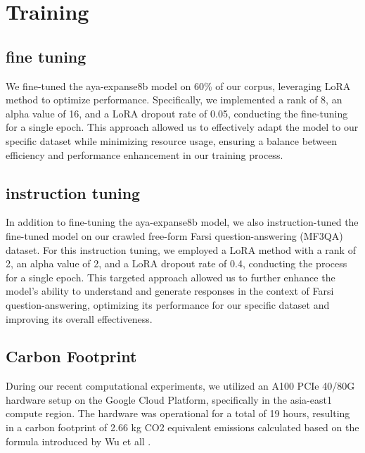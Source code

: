 \documentclass[conference]{IEEEtran}
\begin{document}
\section{Training}
\subsection{fine tuning}
We fine-tuned the aya-expanse8b model on 60\% of our corpus, leveraging LoRA
\cite{b13}
method to optimize performance. Specifically, we implemented a rank of 8, an alpha value of 16, and a LoRA dropout rate of 0.05, conducting the fine-tuning for a single epoch. This approach allowed us to effectively adapt the model to our specific dataset while minimizing resource usage, ensuring a balance between efficiency and performance enhancement in our training process.
\subsection{instruction tuning}
In addition to fine-tuning the aya-expanse8b model, we also instruction-tuned the fine-tuned model on our crawled free-form Farsi question-answering (MF3QA) dataset. For this instruction tuning, we employed a LoRA method with a rank of 2, an alpha value of 2, and a LoRA dropout rate of 0.4, conducting the process for a single epoch. This targeted approach allowed us to further enhance the model’s ability to understand and generate responses in the context of Farsi question-answering, optimizing its performance for our specific dataset and improving its overall effectiveness.
\subsection{Carbon Footprint}
During our recent computational experiments, we utilized an A100 PCIe 40/80G hardware setup on the Google Cloud Platform, specifically in the asia-east1 compute region. The hardware was operational for a total of 19 hours, resulting in a carbon footprint of 2.66 kg CO2 equivalent emissions calculated  based on the formula introduced by Wu et all
\cite{b14}
.
\end{document}
